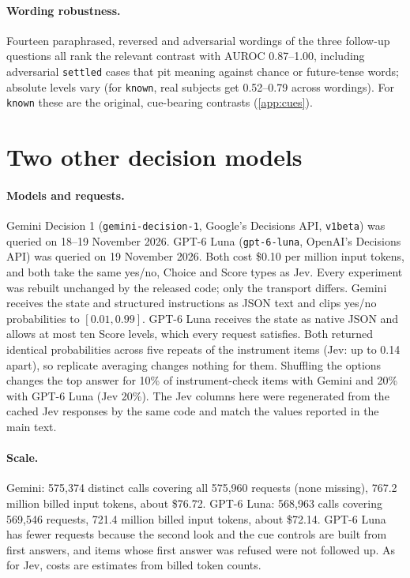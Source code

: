 \documentclass[10pt,twocolumn]{article}
\begin{document}
\paragraph{Wording robustness.} Fourteen paraphrased, reversed and adversarial
wordings of the three follow-up questions all rank the relevant contrast with
AUROC 0.87--1.00, including adversarial \texttt{settled} cases that pit meaning
against chance or future-tense words; absolute levels vary (for \texttt{known},
real subjects get 0.52--0.79 across wordings). For \texttt{known} these are the
original, cue-bearing contrasts (\cref{app:cues}).

\section{Two other decision models}
\label{app:cross}

\paragraph{Models and requests.} Gemini Decision 1 (\texttt{gemini-decision-1},
Google's Decisions API, \texttt{v1beta}) was queried on 18--19 November 2026.
GPT-6 Luna (\texttt{gpt-6-luna}, OpenAI's Decisions API) was queried on 19
November 2026. Both cost \$0.10 per million input tokens, and both take the
same yes/no, Choice and Score types as Jev. Every experiment was rebuilt
unchanged by the released code; only the transport differs. Gemini receives
the state and structured instructions as JSON text and clips yes/no
probabilities to $[0.01, 0.99]$. GPT-6 Luna receives the state as native
JSON and allows at most ten Score levels, which every request satisfies.
Both returned identical probabilities across five repeats of the instrument
items (Jev: up to 0.14 apart), so replicate averaging changes nothing for
them. Shuffling the options changes the top answer for 10\% of
instrument-check items with Gemini and 20\% with GPT-6 Luna (Jev 20\%).
The Jev columns here were regenerated from the cached Jev responses by the
same code and match the values reported in the main text.

\paragraph{Scale.} Gemini: 575{,}374 distinct calls covering all 575{,}960
requests (none missing), 767.2 million billed input tokens, about \$76.72.
GPT-6 Luna: 568{,}963 calls covering 569{,}546 requests, 721.4 million
billed input tokens, about \$72.14. GPT-6 Luna has fewer requests because
the second look and the cue controls are built from first answers, and items
whose first answer was refused were not followed up. As for Jev, costs are
estimates from billed token counts.
\end{document}

